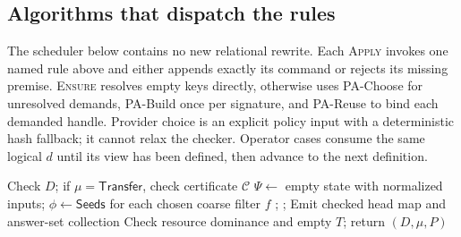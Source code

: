 \subsection{Algorithms that dispatch the rules}
\label{sec:ya-algorithms}
The scheduler below contains no new relational rewrite. Each \textsc{Apply}
invokes one named rule above and either appends exactly its command or rejects
its missing premise. \textsc{Ensure} resolves empty keys directly, otherwise
uses PA-Choose for unresolved demands, PA-Build once per signature, and
PA-Reuse to bind each demanded handle.
Provider choice is an explicit policy input with a deterministic hash fallback;
it cannot relax the checker. Operator cases consume the same logical $d$ until
its view has been defined, then advance to the next definition.

\begin{algorithm}[tbp]
\caption{Physical overlay construction (compile time)}
\label{alg:physical}
\begin{algorithmic}[1]
 \State Check $D$; if $\mu=\mathsf{Transfer}$, check certificate $\mathcal C$
 \State $\Psi\gets$ empty state with normalized inputs; $\phi\gets\mathsf{Seeds}$
  \State {} 
 \EndFor
  \State {} 
   \State {} for each chosen coarse filter $f$
    \State {}
   \Else \State {} \EndIf
    \State {}
   \Else
    \State {}; 
   \EndIf
   \State {}
   \State {}
  \Else \State {}; 
  \EndIf
   \State {}
  \EndIf
   \State {}
  \EndIf
 \EndFor
  \State {}
 \Else \State Emit checked head map and answer-set collection \EndIf
 \State Check resource dominance and empty $T$; return $(D,\mu,P)$
\EndProcedure
\end{algorithmic}
\end{algorithm}
